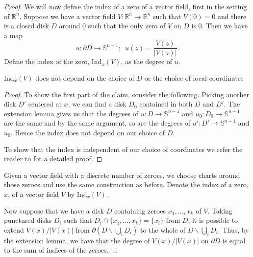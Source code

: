 \begin{proof}
%
%
We will now define the index of a zero of a vector field, first in the setting of $\mathbb{R}^n$. Suppose we have a vector field $V:\mathbb{R}^n\to\mathbb{R}^n$ such that $V(0)=0$ and there is a closed disk $D$ around 0 such that the only zero of $V$ on $D$ is 0. Then we have a map \[u:\partial D\to\mathbb{S}^{n-1};\,\,\, u(z)=\frac{V(z)}{|V(z)|}.\] Define the index of the zero, $\mathrm{Ind}_x(V)$, as the degree of $u$.

\begin{proposition}
$\mathrm{Ind}_x(V)$ does not depend on the choice of $D$ or the choice of local coordinates
\end{proposition}
\begin{proof}
To show the first part of the claim, consider the following. Picking another disk $D'$ centered at $x$, we can find a disk $D_0$ contained in both $D$ and $D'$. The extension lemma gives us that the degrees of $u:D\to\mathbb{S}^{n-1}$ and $u_0:D_0\to\mathbb{S}^{n-1}$ are the same and by the same argument, so are the degrees of $u':D'\to\mathbb{S}^{n-1}$ and $u_0$. Hence the index does not depend on our choice of $D$.

To show that the index is independent of our choice of coordinates we refer the reader to \cite{BurnsGidea} for a detailed proof.

\end{proof}

Given a vector field with a discrete number of zeroes, we choose charts around those zeroes and use the same construction as before. Denote the index of a zero, $x$, of a vector field $V$ by $\mathrm{Ind}_x(V)$.

Now suppose that we have a disk $D$ containing zeroes $x_1,\ldots,x_k$ of $V$. Taking punctured disks $D_i$ such that $D_i\cap\{x_1,\ldots,x_k\}=\{x_i\}$ from $D$, it is possible to extend $V(x)/|V(x)|$ from $\partial(D\backslash\bigcup_iD_i)$ to the whole of $D\backslash\bigcup_iD_i$. Thus, by the extension lemma, we have that the degree of $V(x)/|V(x)|$ on $\partial D$ is equal to the sum of indices of the zeroes.


\end{proof}
